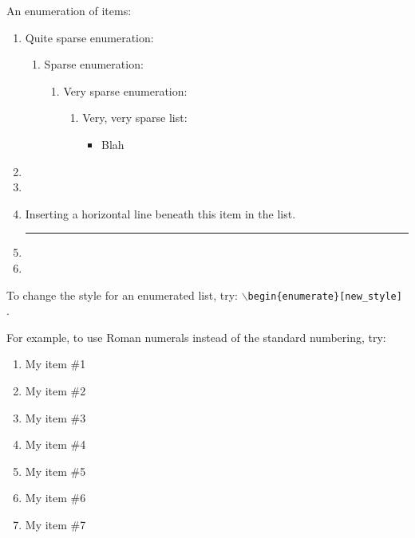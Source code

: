 An enumeration of items: \vspace{-0.3cm}
\begin{enumerate} \itemsep -4pt
\item Quite sparse enumeration: \vspace{-0.3cm}
	\begin{enumerate} \itemsep -2pt
	\item Sparse enumeration: \vspace{-0.2cm}
		\begin{enumerate} \itemsep -2pt
		\item Very sparse enumeration: \vspace{-0.1cm}
			\begin{enumerate} \itemsep -1pt
			\item Very, very sparse list: \vspace{-0.1cm}
				\begin{itemize} \itemsep -1pt
				\item Blah
				\end{itemize}
			\end{enumerate}
		\end{enumerate}
	\end{enumerate}
\item 
\item 
\item Inserting a horizontal line beneath this item in the list.
\\ \rule{6in}{.1pt}
\item 
\item 
\end{enumerate}



To change the style for an enumerated list, try: {\tt $\backslash$begin\{enumerate\}[new\_style]} \cite{Kopka2004}.

For example, to use Roman numerals instead of the standard numbering, try: \vspace{-0.3cm}
\begin{enumerate}[I-1] \itemsep -4pt
\item My item \#1
\item My item \#2
\item My item \#3
\item My item \#4
\item My item \#5
\item My item \#6
\item My item \#7
\end{enumerate}



